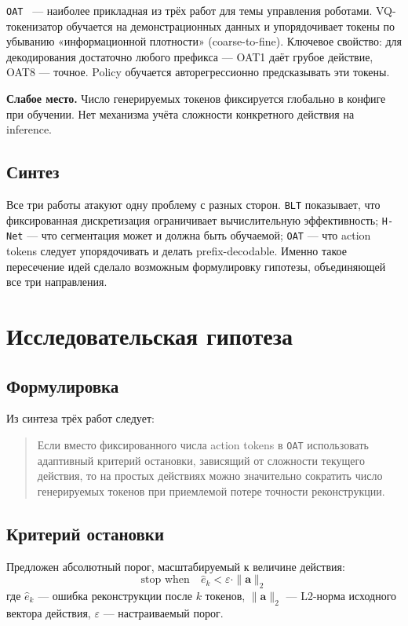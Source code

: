 \documentclass[12pt,a4paper]{article}
\begin{document}
\texttt{OAT}~\cite{oat} --- наиболее прикладная из трёх работ для темы управления
роботами. VQ-токенизатор обучается на демонстрационных данных и упорядочивает
токены по убыванию «информационной плотности» (coarse-to-fine). Ключевое свойство:
для декодирования достаточно любого префикса --- OAT1 даёт грубое действие,
OAT8 --- точное. Policy обучается авторегрессионно предсказывать эти токены.

\textbf{Слабое место.} Число генерируемых токенов фиксируется глобально в конфиге
при обучении. Нет механизма учёта сложности конкретного действия на inference.

\subsection{Синтез}

Все три работы атакуют одну проблему с разных сторон.
\texttt{BLT} показывает, что фиксированная дискретизация ограничивает
вычислительную эффективность;
\texttt{H-Net} --- что сегментация может и должна быть обучаемой;
\texttt{OAT} --- что action tokens следует упорядочивать и делать prefix-decodable.
Именно такое пересечение идей сделало возможным формулировку гипотезы,
объединяющей все три направления.

\section{Исследовательская гипотеза}

\subsection{Формулировка}

Из синтеза трёх работ следует:

\begin{quote}
Если вместо фиксированного числа action tokens в \texttt{OAT} использовать
адаптивный критерий остановки, зависящий от сложности текущего действия,
то на простых действиях можно значительно сократить число генерируемых токенов
при приемлемой потере точности реконструкции.
\end{quote}

\subsection{Критерий остановки}

Предложен абсолютный порог, масштабируемый к величине действия:
\begin{equation}
    \text{stop when} \quad \hat{e}_k < \varepsilon \cdot \|\mathbf{a}\|_2
    \label{eq:stopping}
\end{equation}
где $\hat{e}_k$ --- ошибка реконструкции после $k$ токенов,
$\|\mathbf{a}\|_2$ --- L2-норма исходного вектора действия,
$\varepsilon$ --- настраиваемый порог.
\end{document}
